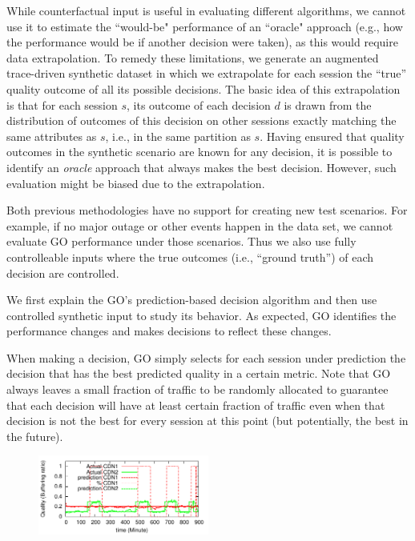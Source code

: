  While counterfactual input
is useful in evaluating different algorithms, we cannot use it to
estimate the ``would-be" performance of an ``oracle" approach (e.g.,
how the performance would be if another decision were taken), as this
would require data extrapolation. To remedy these limitations, we
generate an augmented trace-driven synthetic dataset in which we
extrapolate for each session the ``true'' quality outcome of all its
possible decisions. The basic idea of this extrapolation is that for
each session $s$, its outcome of each decision $d$ is drawn from the
distribution of outcomes of this decision on other sessions exactly
matching the same attributes as $s$, i.e., in the same partition as
$s$. Having ensured that quality outcomes in the synthetic scenario
are known for any decision, it is possible to identify an {\it oracle}
approach that always makes the best decision. However, such evaluation
might be biased due to the extrapolation.

 Both previous methodologies
have no support for creating new test scenarios. For example, if no
major outage or other events happen in the data set, we cannot
evaluate GO performance under those scenarios. Thus we also use fully
controlleable inputs where the true outcomes (i.e., ``ground truth'')
of each decision are controlled.


\label{subsec:behavior}

We first explain the GO's prediction-based decision algorithm and then
use controlled synthetic input to study its behavior. As expected, GO
identifies the performance changes and makes decisions to reflect
these changes.

 When making a decision, GO
simply selects for each session under prediction the decision that has
the best predicted quality in a certain metric. Note that GO always
leaves a small fraction of traffic to be randomly allocated to
guarantee that each decision will have at least certain fraction of
traffic even when that decision is not the best for every session at
this point (but potentially, the best in the future).

\begin{figure}[h!]
\centering
 \includegraphics[width=0.5\textwidth] {figures/behavior-evaluation/simple-change.pdf}
\label{fig:behavioral}
\end{figure}

